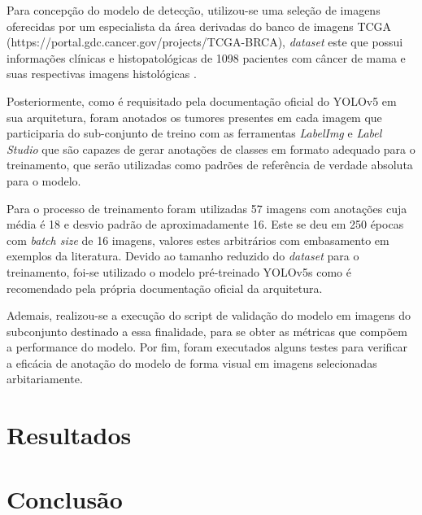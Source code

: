 \documentclass[12pt]{article}
\begin{document}
Para concepção do modelo de detecção, utilizou-se uma seleção de imagens oferecidas por um especialista da área derivadas do banco de imagens TCGA (https://portal.gdc.cancer.gov/projects/TCGA-BRCA), {\it dataset} este que possui informações clínicas e histopatológicas de 1098 pacientes com câncer de mama e suas respectivas imagens histológicas \cite{tiezzi2020}.

Posteriormente, como é requisitado pela documentação oficial do YOLOv5 \cite{glenn_jocher_2022} em sua arquitetura, foram anotados os tumores presentes em cada imagem que participaria do sub-conjunto de treino com as ferramentas {\it LabelImg} \cite{tzutalin2015labelimg} e {\it Label Studio} \cite{labelStudio} que são capazes de gerar anotações de classes em formato adequado para o treinamento, que serão utilizadas como padrões de referência de verdade absoluta para o modelo.

Para o processo de treinamento foram utilizadas 57 imagens com anotações cuja média é 18 e desvio padrão de aproximadamente 16. Este se deu em 250 épocas com {\it batch size} de 16 imagens, valores estes arbitrários com embasamento em exemplos da literatura. Devido ao tamanho reduzido do {\it dataset} para o treinamento, foi-se utilizado o modelo pré-treinado YOLOv5s \cite{glenn_jocher_2022} como é recomendado pela própria documentação oficial da arquitetura.

Ademais, realizou-se a execução do script de validação do modelo em imagens do subconjunto destinado a essa finalidade, para se obter as métricas que compõem a performance do modelo. Por fim, foram executados alguns testes para verificar a eficácia de anotação do modelo de forma visual em imagens selecionadas arbitariamente.

\section{Resultados}

\section{Conclusão}



\end{document}
